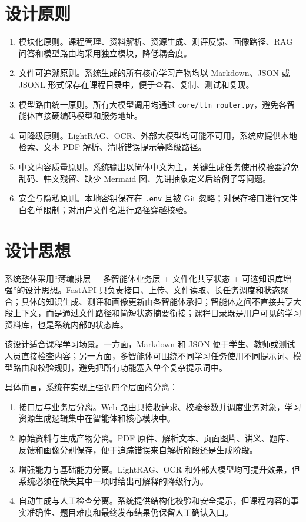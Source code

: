 \documentclass[UTF8,fontset=windows,zihao=-4,openany]{ctexrep}
\begin{document}
\section{设计原则}

\begin{enumerate}
  \item 模块化原则。课程管理、资料解析、资源生成、测评反馈、画像路径、RAG 问答和模型路由均采用独立模块，降低耦合度。
  \item 文件可追溯原则。系统生成的所有核心学习产物均以 Markdown、JSON 或 JSONL 形式保存在课程目录中，便于查看、复制、测试和复现。
  \item 模型路由统一原则。所有大模型调用均通过 \texttt{core/llm\_router.py}，避免各智能体直接硬编码模型和服务地址。
  \item 可降级原则。LightRAG、OCR、外部大模型均可能不可用，系统应提供本地检索、文本 PDF 解析、清晰错误提示等降级路径。
  \item 中文内容质量原则。系统输出以简体中文为主，关键生成任务使用校验器避免乱码、韩文残留、缺少 Mermaid 图、先讲抽象定义后给例子等问题。
  \item 安全与隐私原则。本地密钥保存在 \texttt{.env} 且被 Git 忽略；对保存接口进行文件白名单限制；对用户文件名进行路径穿越校验。
\end{enumerate}

\section{设计思想}

系统整体采用“薄编排层 + 多智能体业务层 + 文件化共享状态 + 可选知识库增强”的设计思想。FastAPI 只负责接口、上传、文件读取、长任务调度和状态聚合；具体的知识生成、测评和画像更新由各智能体承担；智能体之间不直接共享大段上下文，而是通过文件路径和简短状态摘要衔接；课程目录既是用户可见的学习资料库，也是系统内部的状态库。

该设计适合课程学习场景。一方面，Markdown 和 JSON 便于学生、教师或测试人员直接检查内容；另一方面，多智能体可围绕不同学习任务使用不同提示词、模型路由和校验规则，避免把所有功能塞入单个复杂提示词中。

具体而言，系统在实现上强调四个层面的分离：
\begin{enumerate}
  \item 接口层与业务层分离。Web 路由只接收请求、校验参数并调度业务对象，学习资源生成逻辑集中在智能体和核心模块中。
  \item 原始资料与生成产物分离。PDF 原件、解析文本、页面图片、讲义、题库、反馈和画像分别保存，便于追踪错误来自解析阶段还是生成阶段。
  \item 增强能力与基础能力分离。LightRAG、OCR 和外部大模型均可提升效果，但系统必须在缺失其中一项时给出可解释的降级行为。
  \item 自动生成与人工检查分离。系统提供结构化校验和安全提示，但课程内容的事实准确性、题目难度和最终发布结果仍保留人工确认入口。
\end{enumerate}
\end{document}
